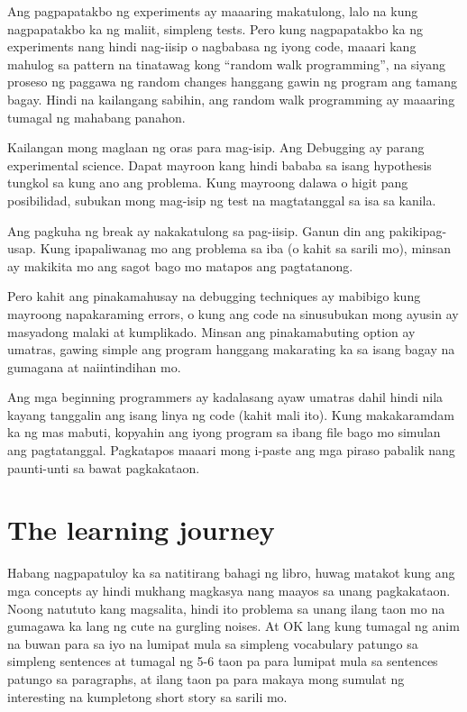 \documentclass[10pt,]{book}
\begin{document}

Ang pagpapatakbo ng experiments ay maaaring makatulong, lalo na kung
nagpapatakbo ka ng maliit, simpleng tests. Pero kung nagpapatakbo ka ng
experiments nang hindi nag-iisip o nagbabasa ng iyong code, maaari kang
mahulog sa pattern na tinatawag kong ``random walk programming'', na
siyang proseso ng paggawa ng random changes hanggang gawin ng program
ang tamang bagay. Hindi na kailangang sabihin, ang random walk
programming ay maaaring tumagal ng mahabang panahon.


Kailangan mong maglaan ng oras para mag-isip. Ang Debugging ay parang
experimental science. Dapat mayroon kang hindi bababa sa isang
hypothesis tungkol sa kung ano ang problema. Kung mayroong dalawa o
higit pang posibilidad, subukan mong mag-isip ng test na magtatanggal sa
isa sa kanila.

Ang pagkuha ng break ay nakakatulong sa pag-iisip. Ganun din ang
pakikipag-usap. Kung ipapaliwanag mo ang problema sa iba (o kahit sa
sarili mo), minsan ay makikita mo ang sagot bago mo matapos ang
pagtatanong.

Pero kahit ang pinakamahusay na debugging techniques ay mabibigo kung
mayroong napakaraming errors, o kung ang code na sinusubukan mong ayusin
ay masyadong malaki at kumplikado. Minsan ang pinakamabuting option ay
umatras, gawing simple ang program hanggang makarating ka sa isang bagay
na gumagana at naiintindihan mo.

Ang mga beginning programmers ay kadalasang ayaw umatras dahil hindi
nila kayang tanggalin ang isang linya ng code (kahit mali ito). Kung
makakaramdam ka ng mas mabuti, kopyahin ang iyong program sa ibang file
bago mo simulan ang pagtatanggal. Pagkatapos maaari mong i-paste ang mga
piraso pabalik nang paunti-unti sa bawat pagkakataon.

\section{The learning journey}\label{the-learning-journey}

Habang nagpapatuloy ka sa natitirang bahagi ng libro, huwag matakot kung
ang mga concepts ay hindi mukhang magkasya nang maayos sa unang
pagkakataon. Noong natututo kang magsalita, hindi ito problema sa unang
ilang taon mo na gumagawa ka lang ng cute na gurgling noises. At OK lang
kung tumagal ng anim na buwan para sa iyo na lumipat mula sa simpleng
vocabulary patungo sa simpleng sentences at tumagal ng 5-6 taon pa para
lumipat mula sa sentences patungo sa paragraphs, at ilang taon pa para
makaya mong sumulat ng interesting na kumpletong short story sa sarili
mo.
\end{document}
